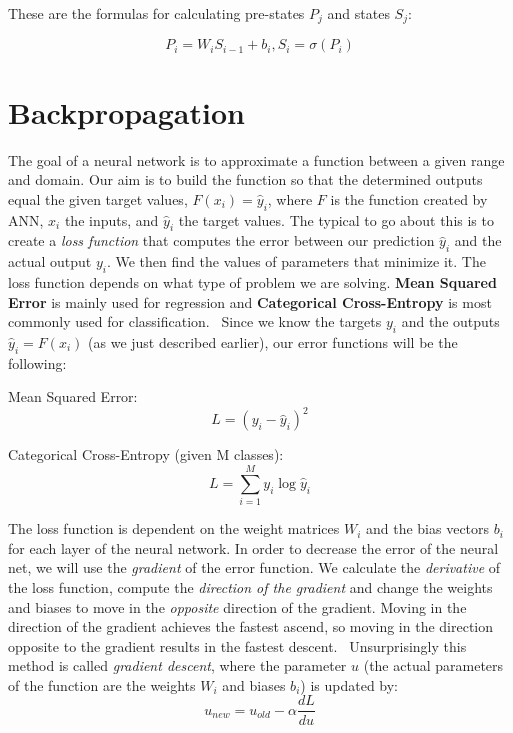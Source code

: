 These are the formulas for calculating pre-states $P_j$ and states $S_j$:

\[
    P_i = W_i S_{i-1} + b_i, S_i = \sigma (P_i)
\]


\section{Backpropagation}\label{sec:backpropagation}

The goal of a neural network is to approximate a function between a given range and domain.
Our aim is to build the function so that the determined outputs equal the given target values, $F (x_i) = \hat y_i$, where $F$ is the function created by ANN, $x_i$ the inputs, and $\hat y_i$ the target values.
The typical to go about this is to create a \textit{loss function} that computes the error between our prediction $\hat y_i$ and the actual output $y_i$.
We then find the values of parameters that minimize it.
The loss function depends on what type of problem we are solving.
\textbf{Mean Squared Error} is mainly used for regression and \textbf{Categorical Cross-Entropy} is most commonly used for classification.~\cite{ann-basics}
Since we know the targets $y_i$ and the outputs $\hat y_i = F (x_i)$ (as we just described earlier), our error functions will be the following:

Mean Squared Error: \[ L=(y_i - \hat y_i)^2 \]

Categorical Cross-Entropy (given M classes): \[ L=\sum_{i=1}^{M} y_i \log \hat y_i \]

The loss function is dependent on the weight matrices $W_i$ and the bias vectors $b_i$ for each layer of the neural network.
In order to decrease the error of the neural net, we will use the \textit{gradient} of the error function.
We calculate the \textit{derivative} of the loss function, compute the \textit{direction of the gradient} and change the weights and biases to move in the \textit{opposite} direction of the gradient.
Moving in the direction of the gradient achieves the fastest ascend, so moving in the direction opposite to the gradient results in the fastest descent.~\cite{ann-basics}
Unsurprisingly this method is called \textit{gradient descent}, where the parameter $u$ (the actual parameters of the function are the weights $W_i$ and biases $b_i$) is updated by:
\[ u_{new} = u_{old} - \alpha \frac{dL}{du} \]

